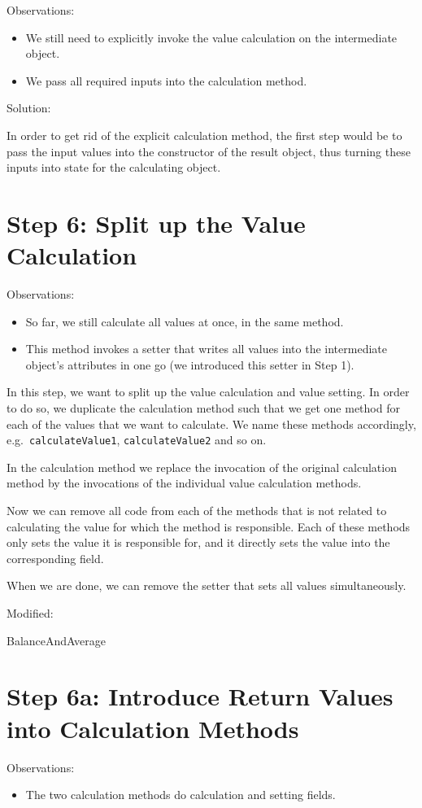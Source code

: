 \documentclass[a4paper,fleqn,titlepage,11pt]{article}
\begin{document}
Observations:
\begin{itemize}
\item We still need to explicitly invoke the value calculation on the intermediate object. 
\item We pass all required inputs into the calculation method.
\end{itemize}

Solution:

In order to get rid of the explicit calculation method, the first step would be to pass the input values into the constructor of the result object, thus turning these inputs into state for the calculating object.

\section*{Step 6: Split up the Value Calculation}

Observations:
\begin{itemize}
\item So far, we still calculate all values at once, in the same method. 
\item This method invokes a setter that writes all values into the intermediate object's attributes in one go (we introduced this setter in Step 1).
\end{itemize}

In this step, we want to split up the value calculation and value setting. In order to do so, we duplicate the calculation method such that we get one method for each of the values that we want to calculate. We name these methods accordingly, e.g.~\texttt{calculateValue1}, \texttt{calculateValue2} and so on.

In the calculation method we replace the invocation of the original calculation method by the invocations of the individual value calculation methods.

Now we can remove all code from each of the methods that is not related to calculating the value for which the method is responsible. Each of these methods only sets the value it is responsible for, and it directly sets the value into the corresponding field.

When we are done, we can remove the setter that sets all values simultaneously.

Modified:

BalanceAndAverage

\section*{Step 6a: Introduce Return Values into Calculation Methods}
Observations:
\begin{itemize}
\item The two calculation methods do calculation and setting fields. 
\end{itemize}
\end{document}
